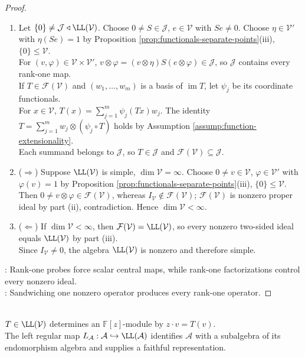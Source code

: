 \begin{theorem}
\begin{proof}
\begin{enumerate}[label=(\roman*)]
\item[$(iii)$] Let $\{0\}\neq\mathcal{J}\triangleleft\LL(\mathcal{V})$. Choose $0\neq S\in\mathcal{J}$, $e\in\mathcal{V}$ with $Se\neq0$. Choose $\eta\in\mathcal{V}'$ with $\eta(Se)=1$ by Proposition \ref{prop:functionals-separate-points}(iii), $\{0\}\leq\mathcal{V}$.\\
For $(v,\varphi)\in\mathcal{V}\times\mathcal{V}'$, $v\otimes\varphi=(v\otimes\eta)S(e\otimes\varphi)\in\mathcal{J}$, so $\mathcal{J}$ contains every rank-one map.\\
If $T\in\mathcal{F}(\mathcal{V})$ and $(w_1,\ldots,w_m)$ is a basis of $\operatorname{im}T$, let $\psi_j$ be its coordinate functionals.\\
For $x\in\mathcal{V}$, $T(x)=\sum\limits_{j=1}^{m}\psi_j(Tx)w_j$. The identity $T=\sum\limits_{j=1}^{m}w_j\otimes(\psi_j\circ T)$ holds by Assumption \ref{assump:function-extensionality}.\\
Each summand belongs to $\mathcal{J}$, so $T\in\mathcal{J}$ and $\mathcal{F}(\mathcal{V})\subseteq\mathcal{J}$.
\item[$(iv)$] ($\Rightarrow$) Suppose $\LL(\mathcal{V})$ is simple, $\dim\mathcal{V}=\infty$. Choose $0\neq v\in\mathcal{V}$, $\varphi\in\mathcal{V}'$ with $\varphi(v)=1$ by Proposition \ref{prop:functionals-separate-points}(iii), $\{0\}\leq\mathcal{V}$.\\
Then $0\neq v\otimes\varphi\in\mathcal{F}(\mathcal{V})$, whereas $I_{\mathcal{V}}\notin\mathcal{F}(\mathcal{V})$; $\mathcal{F}(\mathcal{V})$ is nonzero proper ideal by part (ii), contradiction. Hence $\dim\mathcal{V}<\infty$.
\item[$(iv)$] ($\Leftarrow$) If $\dim\mathcal{V}<\infty$, then $\mathcal{F}(\mathcal{V})=\LL(\mathcal{V})$, so every nonzero two-sided ideal equals $\LL(\mathcal{V})$ by part (iii).\\
Since $I_{\mathcal{V}}\neq0$, the algebra $\LL(\mathcal{V})$ is nonzero and therefore simple.
\end{enumerate}
: Rank-one probes force scalar central maps, while rank-one factorizations control every nonzero ideal.\\
: Sandwiching one nonzero operator produces every rank-one operator.
\end{proof}
\end{theorem}

\begin{perspective} \label{per:algebra-chapter-operator-connection} \\
$T\in\LL(\mathcal{V})$ determines an $\mathbb{F}[z]$-module by $z\cdot v=T(v)$.\\
The left regular map $L_{\mathcal{A}}:\mathcal{A}\hookrightarrow\LL(\mathcal{A})$ identifies $\mathcal{A}$ with a subalgebra of its endomorphism algebra and supplies a faithful representation.
\end{perspective}
